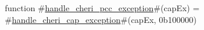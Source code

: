 function #\hyperref[sailRISCVzhandlezycherizypcczyexception]{handle\_cheri\_pcc\_exception}#(capEx) =
  #\hyperref[sailRISCVzhandlezycherizycapzyexception]{handle\_cheri\_cap\_exception}#(capEx, 0b100000)
